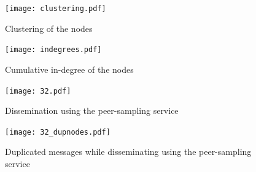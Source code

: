 \documentclass[11pt,a4paper]{scrartcl}
\begin{document}
\begin{figure}
	\centering
	\texttt{[image: clustering.pdf]}
	\caption{Clustering of the nodes}
	\label{fig:clustering}
\end{figure}
\begin{figure}
	\centering
	\texttt{[image: indegrees.pdf]}
	\caption{Cumulative in-degree of the nodes}
	\label{fig:indegrees}
\end{figure}
\begin{figure}
	\centering
	\texttt{[image: 32.pdf]}
	\caption{Dissemination using the peer-sampling service}
	\label{fig:32}
\end{figure}
\begin{figure}
	\centering
	\texttt{[image: 32\_dupnodes.pdf]}
	\caption{Duplicated messages while disseminating using the peer-sampling service}
	\label{fig:32-dup}
\end{figure}
\end{document}
